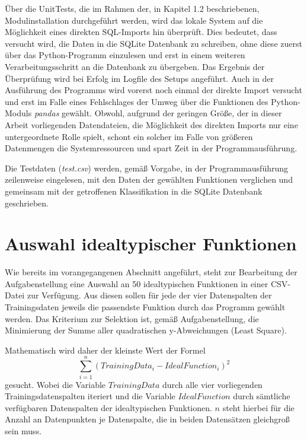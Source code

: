 Über die UnitTests, die im Rahmen der, in Kapitel 1.2 beschriebenen, Modulinstallation durchgeführt werden, wird das lokale System auf die Möglichkeit eines direkten SQL-Imports hin überprüft. Dies bedeutet, dass versucht wird, die Daten in die SQLite Datenbank zu schreiben, ohne diese zuerst über das Python-Programm einzulesen und erst in einem weiteren Verarbeitungsschritt an die Datenbank zu übergeben. Das Ergebnis der Überprüfung wird bei Erfolg im Logfile des Setups angeführt. Auch in der Ausführung des Programms wird vorerst noch einmal der direkte Import versucht und erst im Falle eines Fehlschlages der Umweg über die Funktionen des Python-Moduls \emph{pandas} gewählt. Obwohl, aufgrund der geringen Größe, der in dieser Arbeit vorliegenden Datendateien, die Möglichkeit des direkten Imports nur eine untergeordnete Rolle spielt, schont ein solcher im Falle von größeren Datenmengen die Systemressourcen und spart Zeit in der Programmausführung.

Die Testdaten (\emph{test.csv}) werden, gemäß Vorgabe, in der Programmausführung zeilenweise eingelesen, mit den Daten der gewählten Funktionen verglichen und gemeinsam mit der getroffenen Klassifikation in die SQLite Datenbank geschrieben.


\section{Auswahl idealtypischer Funktionen}

Wie bereits im vorangegangenen Abschnitt angeführt, steht zur Bearbeitung der Aufgabenstellung eine Auswahl an 50 idealtypischen Funktionen in einer CSV-Datei zur Verfügung. Aus diesen sollen für jede der vier Datenspalten der Trainingsdaten jeweils die passendste Funktion durch das Programm gewählt werden. Das Kriterium zur Selektion ist, gemäß Aufgabenstellung, die Minimierung der Summe aller quadratischen y-Abweichungen (Least Square).

Mathematisch wird daher der kleinste Wert der Formel
\begin{equation}  
\sum_{i=1}^{n}(TrainingData_{i} - IdealFunction_{i})^2
\label{leastsquare}
\end{equation}
gesucht. Wobei die Variable $TrainingData$ durch alle vier vorliegenden Trainingsdatenspalten iteriert und die Variable $IdealFunction$ durch sämtliche verfügbaren Datenspalten der idealtypischen Funktionen. $n$ steht hierbei für die Anzahl an Datenpunkten je Datenspalte, die in beiden Datensätzen gleichgroß sein muss. 

